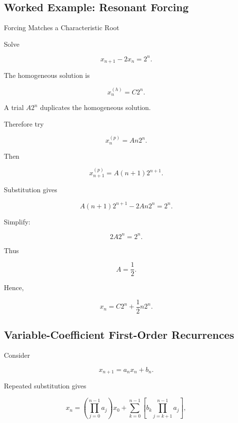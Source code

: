 \subsection{Worked Example: Resonant Forcing}
\label{subsec:worked-discrete-resonance}

\begin{workedexamplebox}{Forcing Matches a Characteristic Root}

Solve

\[
x_{n+1}
-
2x_n
=
2^n.
\]

The homogeneous solution is

\[
x_n^{(h)}
=
C2^n.
\]

A trial \(A2^n\) duplicates the homogeneous solution.

Therefore try

\[
x_n^{(p)}
=
An2^n.
\]

Then

\[
x_{n+1}^{(p)}
=
A(n+1)2^{n+1}.
\]

Substitution gives

\[
A(n+1)2^{n+1}
-
2An2^n
=
2^n.
\]

Simplify:

\[
2A2^n
=
2^n.
\]

Thus

\[
A=\frac12.
\]

Hence,

\begin{answerbox}
\[
\boxed{
x_n
=
C2^n
+
\frac12n2^n.
}
\]
\end{answerbox}

\end{workedexamplebox}

\subsection{Variable-Coefficient First-Order Recurrences}
\label{subsec:variable-coefficient-first-order-recurrence}

Consider

\[
\boxed{
x_{n+1}
=
a_nx_n+b_n.
}
\]

Repeated substitution gives

\[
x_n
=
\left(
\prod_{j=0}^{n-1}a_j
\right)x_0
+
\sum_{k=0}^{n-1}
\left[
b_k
\prod_{j=k+1}^{n-1}
a_j
\right],
\]

